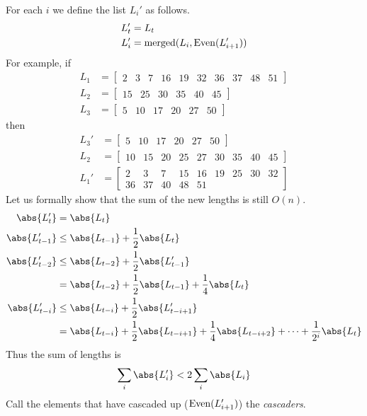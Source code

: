 \begin{solution}
    For each $i$ we define the list $L_i'$ as follows.
    \begin{align*}
        L_t' &= L_t \\
        L_i' &= \operatorname{merged}(L_i, \operatorname{Even}(L_{i+1}'))
    \end{align*}
    For example, if \begin{align*}
        L_1 &= \begin{bmatrix}
            2 & 3 & 7 & 16 & 19 & 32 & 36 & 37 & 48 & 51
        \end{bmatrix} \\
        L_2 &= \begin{bmatrix}
            15 & 25 & 30 & 35 & 40 & 45
        \end{bmatrix} \\
        L_3 &= \begin{bmatrix}
            5 & 10 & 17 & 20 & 27 & 50
        \end{bmatrix}
    \end{align*} then \begin{align*}
        L_3' &= \begin{bmatrix}
            5 & 10 & 17 & 20 & 27 & 50
        \end{bmatrix} \\
        L_2 &= \begin{bmatrix}
            10 & 15 & 20 & 25 & 27 & 30 & 35 & 40 & 45
        \end{bmatrix} \\
        L_1' &= \begin{bmatrix}
            2 & 3 & 7 & 15 & 16 & 19 & 25 & 30 & 32 \\ 36 & 37 & 40 & 48 & 51
        \end{bmatrix}
    \end{align*}
    Let us formally show that the sum of the new lengths is still $O(n)$.
    \begin{align*}
        \abs{L_t'} &= \abs{L_t} \\
        \abs{L_{t-1}'} &\le \abs{L_{t-1}} + \frac12 \abs{L_t} \\
        \abs{L_{t-2}'} &\le \abs{L_{t-2}} + \frac12 \abs{L_{t-1}'} \\
        &= \abs{L_{t-2}} + \frac12 \abs{L_{t-1}} + \frac14 \abs{L_t} \\
        \abs{L_{t-i}'} &\le \abs{L_{t-i}} + \frac12 \abs{L_{t-i+1}'} \\
        &= \abs{L_{t-i}} + \frac12 \abs{L_{t-i+1}} +
            \frac14 \abs{L_{t-i+2}} + \dots + \frac{1}{2^i} \abs{L_t}
    \end{align*}
    Thus the sum of lengths is \[
        \sum_i \abs{L_i'} < 2 \sum_i \abs{L_i}
    \]
    Call the elements that have cascaded up ($\operatorname{Even}(L_{i+1}')$) the
    \emph{cascaders}.


\end{solution}
